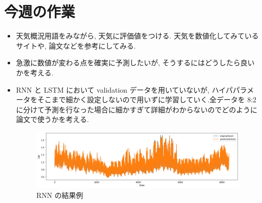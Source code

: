 
%

\section{今週の作業}
\begin{itemize}
        \item 天気概況用語をみながら, 天気に評価値をつける. 天気を数値化してみているサイトや, 論文などを参考にしてみる. 
        \item 急激に数値が変わる点を確実に予測したいが, そうするにはどうしたら良いかを考える.
        \item RNN と LSTM において validation データを用いていないが, ハイパパラメータをそこまで細かく設定しないので用いずに学習していく.全データを 8:2 に分けて予測を行なった場合に細かすぎて詳細がわからないのでどのように論文で使うかを考える.

\begin{figure}[phb]
\centering
\includegraphics[scale=0.5]{kekka.png}
\caption{RNN の結果例}
\end{figure}
\end{itemize}

